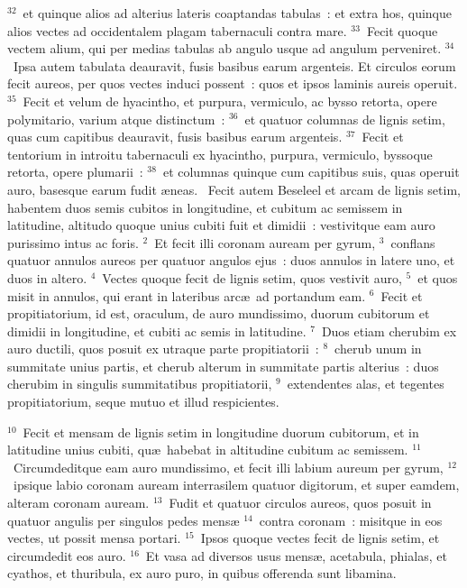 ${}^{32}$~et quinque alios ad alterius lateris coaptandas tabulas~: et extra hos, quinque alios vectes ad occidentalem plagam tabernaculi contra mare.
${}^{33}$~Fecit quoque vectem alium, qui per medias tabulas ab angulo usque ad angulum perveniret.
${}^{34}$~Ipsa autem tabulata deauravit, fusis basibus earum argenteis. Et circulos eorum fecit aureos, per quos vectes induci possent~: quos et ipsos laminis aureis operuit.
${}^{35}$~Fecit et velum de hyacintho, et purpura, vermiculo, ac bysso retorta, opere polymitario, varium atque distinctum~:
${}^{36}$~et quatuor columnas de lignis setim, quas cum capitibus deauravit, fusis basibus earum argenteis.
${}^{37}$~Fecit et tentorium in introitu tabernaculi ex hyacintho, purpura, vermiculo, byssoque retorta, opere plumarii~:
${}^{38}$~et columnas quinque cum capitibus suis, quas operuit auro, basesque earum fudit \ae neas.
~\lettrine[lines=10,image=true,loversize=0.05,lraise=-0.03]{F}{}ecit autem Beseleel et arcam de lignis setim, habentem duos semis cubitos in longitudine, et cubitum ac semissem in latitudine, altitudo quoque unius cubiti fuit et dimidii~: vestivitque eam auro purissimo intus ac foris.
${}^{2}$~Et fecit illi coronam auream per gyrum,
${}^{3}$~conflans quatuor annulos aureos per quatuor angulos ejus~: duos annulos in latere uno, et duos in altero.
${}^{4}$~Vectes quoque fecit de lignis setim, quos vestivit auro,
${}^{5}$~et quos misit in annulos, qui erant in lateribus arc\ae\ ad portandum eam.
${}^{6}$~Fecit et propitiatorium, id est, oraculum, de auro mundissimo, duorum cubitorum et dimidii in longitudine, et cubiti ac semis in latitudine.
${}^{7}$~Duos etiam cherubim ex auro ductili, quos posuit ex utraque parte propitiatorii~:
${}^{8}$~cherub unum in summitate unius partis, et cherub alterum in summitate partis alterius~: duos cherubim in singulis summitatibus propitiatorii,
${}^{9}$~extendentes alas, et tegentes propitiatorium, seque mutuo et illud respicientes.


${}^{10}$~Fecit et mensam de lignis setim in longitudine duorum cubitorum, et in latitudine unius cubiti, qu\ae\ habebat in altitudine cubitum ac semissem.
${}^{11}$~Circumdeditque eam auro mundissimo, et fecit illi labium aureum per gyrum,
${}^{12}$~ipsique labio coronam auream interrasilem quatuor digitorum, et super eamdem, alteram coronam auream.
${}^{13}$~Fudit et quatuor circulos aureos, quos posuit in quatuor angulis per singulos pedes mens\ae 
${}^{14}$~contra coronam~: misitque in eos vectes, ut possit mensa portari.
${}^{15}$~Ipsos quoque vectes fecit de lignis setim, et circumdedit eos auro.
${}^{16}$~Et vasa ad diversos usus mens\ae , acetabula, phialas, et cyathos, et thuribula, ex auro puro, in quibus offerenda sunt libamina.


